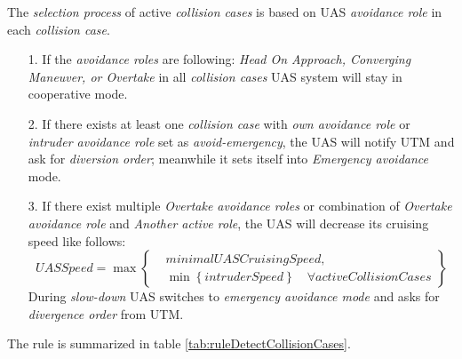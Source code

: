 The \emph{selection process} of active \emph{collision cases} is based on UAS \emph{avoidance role} in each \emph{collision case}.
\begin{itemize}
    \item[1.] If the \emph{avoidance roles} are following: \emph{Head On Approach, Converging Maneuver, or Overtake} in all \emph{collision cases} UAS system will stay in cooperative mode.
    \item[2.] If there exists at least one \emph{collision case} with \emph{own avoidance role} or \emph{intruder avoidance role} set as \emph{avoid-emergency}, the UAS will notify UTM and ask for \emph{diversion order}; meanwhile it sets itself into \emph{Emergency avoidance} mode.
    \item[3.] If there exist multiple \emph{Overtake avoidance roles} or combination of \emph{Overtake avoidance role} and \emph{Another active role}, the UAS will decrease its cruising speed like follows:
    \begin{equation}
        UASSpeed = \max \left\{\begin{aligned}
        & minimalUASCruisingSpeed,\\
        &\min \left\{intruderSpeed\right\}\quad \forall activeCollisionCases
        \end{aligned}
        \right\}
    \end{equation}
    During \emph{slow-down} UAS switches to \emph{emergency avoidance mode} and asks for \emph{divergence order} from UTM.
\end{itemize}

\noindent The rule is summarized in table \ref{tab:ruleDetectCollisionCases}.

